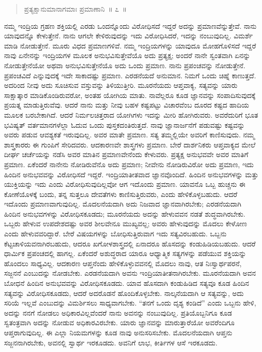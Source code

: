 \vspace{-0.1cm}

\begin{verse}
ಪ್ರತ್ಯಕ್ಷಾನುಮಾನಾಗಮಾಃ ಪ್ರಮಾಣಾನಿ~॥ ೭~॥
\end{verse}

\vspace{-0.3cm}


\vskip 6pt

ನಮ್ಮ ಇಂದ್ರಿಯ ಗ್ರಹಣ ಶಕ್ತಿಯಲ್ಲಿ ಎರಡು ಒಂದನ್ನೊಂದು ವಿರೋಧಿಸದೆ ಇದ್ದರೆ ಅದನ್ನು ಪ್ರಮಾಣವೆನ್ನುತ್ತೇವೆ. ನಾನು ಯಾವುದನ್ನೊ ಕೇಳುತ್ತೇನೆ. ನಾನು ಆಗಲೇ ಕೇಳಿರುವುದನ್ನು ಇದು ವಿರೋಧಿಸಿದರೆ, ಇದನ್ನು ನಂಬುವುದಿಲ್ಲ. ವಿಮರ್ಶೆ ಮಾಡಿ ನೋಡುತ್ತೇನೆ. ಮೂರು ವಿಧದ ಪ್ರಮಾಣಗಳಿವೆ. ನಮ್ಮ ಇಂದ್ರಿಯಗಳನ್ನು ಯಾವುದೂ ಮೋಹಗೊಳಿಸದೆ ಇದ್ದರೆ ನಾವು ಏನೇನನ್ನು ಇಂದ್ರಿಯಗಳ ಮೂಲಕ ಅನುಭವಿಸುತ್ತೇವೆಯೊ ಅದು ಪ್ರತ್ಯಕ್ಷ; ಅಂದರೆ ನಾನೇ ಸ್ವಂತವಾಗಿ ಏನನ್ನು ನೋಡುತ್ತೇನೆಯೋ ಅಥವಾ ಅನುಭವಿಸುತ್ತೇನೆಯೊ ಅದು ಒಂದು ಪ್ರಮಾಣ. ನಾನು ಪ್ರಪಂಚವನ್ನು ನೋಡುತ್ತೇನೆ. ಪ್ರಪಂಚವಿದೆ ಎನ್ನುವುದಕ್ಕೆ ಇದೇ ಸಾಕಾದಷ್ಟು ಪ್ರಮಾಣ. ಎರಡನೆಯದೆ ಅನುಮಾನ. ನಿಮಗೆ ಒಂದು ಚಿಹ್ನೆ ಕಾಣುತ್ತದೆ. ಅದರಿಂದ ನೀವು ಅದು ಸೂಚಿಸುವ ವಸ್ತುವನ್ನು ತಿಳಿಯುತ್ತೀರಿ. ಮೂರನೆಯದು ಆಪ್ತವಾಕ್ಯ, ಸತ್ಯವನ್ನು ಯಾರು ಸಾಕ್ಷಾತ್ಕಾರ ಮಾಡಿಕೊಂಡಿರುವರೋ, ಅಂತಹ ಯೋಗಿಯ ಮಾತು. ನಾವೆಲ್ಲರೂ ಕೂಡ ಜ್ಞಾನವನ್ನು ಸಂಪಾದಿಸುವುದಕ್ಕೆ ಪ್ರಯತ್ನ ಮಾಡುತ್ತಿರುವೆವು. ಆದರೆ ನಾನು ಮತ್ತು ನೀವು ಬಹಳ ಕಷ್ಟಪಟ್ಟು ವಿಚಾರವೆಂಬ ದೂರದ ಕಷ್ಟದ ಹಾದಿಯ ಮೂಲಕ ಬರಬೇಕಾಗಿದೆ. ಆದರೆ ನಿರ್ಮಲಚಿತ್ತರಾದ ಯೋಗಿಗಳು ಇದನ್ನು ಮೀರಿ ಹೋಗಿರುವರು. ಅವರೆದುರಿಗೆ ಭೂತ ಭವಿಷ್ಯತ್​ ವರ್ತಮಾನಗಳೆಲ್ಲಾ ಓದುವ ಒಂದು ಪುಸ್ತಕದಂತಿರುತ್ತದೆ. ನಾವು ಜ್ಞಾನಾರ್ಜನೆಗೆ ಪಡುವಷ್ಟು ಕಷ್ಟವನ್ನು ಅವರು ಪಡುವ ಆವಶ್ಯಕತೆ ಇರುವುದಿಲ್ಲ. ಅವರ ಮಾತೇ ಪ್ರಮಾಣ. ಸತ್ಯ ತಮ್ಮಲ್ಲಿಯೇ ಅವರಿಗೆ ಕಾಣಿಸುವುದು. ನಮ್ಮ ಶಾಸ್ತ್ರಕಾರರು ಈ ಗುಂಪಿಗೆ ಸೇರಿದವರು. ಆದಕಾರಣವೇ ಶಾಸ್ತ್ರಗಳು ಪ್ರಮಾಣ. ಬೇರೆ ದಾರ್ಶನಿಕರು ಆಪ್ತವಾಕ್ಯದ ಮೇಲೆ ದೀರ್ಘ ಚರ್ಚೆಯನ್ನು ನಡೆಸಿ ಅವರ ಮಾತಿನ ಪ್ರಮಾಣವೇನೆಂದು ಕೇಳುವರು. ಪ್ರತ್ಯಕ್ಷ ಅನುಭವವೇ ಅವರ ಮಾತಿಗೆ ಪ್ರಮಾಣ. ಏಕೆಂದರೆ ನಾನೇನು ನೋಡಿರುವೆನೊ ಅದು ಪ್ರಮಾಣ; ನೀವೇನು ನೋಡಿರುವಿರೋ ಅದು ಪ್ರಮಾಣ, ಇದು ಹಿಂದಿನ ಅನುಭವವನ್ನು ವಿರೋಧಿಸದೆ ಇದ್ದರೆ. ಇಂದ್ರಿಯಾತೀತವಾದ ಜ್ಞಾನವೊಂದಿದೆ. ಹಿಂದಿನ ಅನುಭವಗಳನ್ನು ಮತ್ತು ಯುಕ್ತಿಯನ್ನು ಇದು ಎಂದು ವಿರೋಧಿಸುವುದಿಲ್ಲವೋ ಆಗ ಇದೊಂದು ಪ್ರಮಾಣ. ಯಾವನೊ ಒಬ್ಬ ಹುಚ್ಚನು ಈ ಕೋಣೆಯೊಳಕ್ಕೆ ಬಂದು, ತನ್ನ ಸುತ್ತಲೂ ದೇವತೆಗಳು ಕಾಣಿಸುತ್ತಿರುವರು, ಎಂದು ಹೇಳಿಕೊಳ್ಳಬಹುದು. ಆದರೆ ಇದೊಂದು ಪ್ರಮಾಣವಾಗುವುದಿಲ್ಲ. ಮೊದಲನೆಯದಾಗಿ ಅದು ನಿಜವಾದ ಜ್ಞಾನವಾಗಿರಬೇಕು; ಎರಡನೆಯದಾಗಿ ಹಿಂದಿನ ಅನುಭವಗಳನ್ನು ವಿರೋಧಿಸಕೂಡದು; ಮೂರನೆಯದು ಅದನ್ನು ಹೇಳುವವನ ನಡತೆ ಶುದ್ಧವಾಗಿರಬೇಕು. ಒಬ್ಬರು ಹೇಳುವ ಉಪದೇಶದಷ್ಟು ಅವರ ಶೀಲವೇನೂ ಮುಖ್ಯವಲ್ಲ; ಅವರು ಹೇಳುವುದನ್ನು ಮೊದಲು ಕೇಳೋಣ ಎಂದು ಹೇಳುವವರಿದ್ದಾರೆ. ಬೇರೆ ವಿಷಯಗಳನ್ನು ಬೋಧಿಸುತ್ತಿರುವಾಗ ಇದು ಸತ್ಯವಿರಬಹುದು. ಒಬ್ಬನು ಕೆಟ್ಟಚಾಳಿಯವನಾಗಿರಬಹುದು, ಆದರೂ ಖಗೋಳಶಾಸ್ತ್ರದಲ್ಲಿ ಏನಾದರೂ ಹೊಸದನ್ನು ಕಂಡುಹಿಡಿಯಬಹುದು. ಆದರೆ ಧಾರ್ಮಿಕ ಪ್ರಪಂಚದಲ್ಲಿ ಹಾಗಲ್ಲ. ಏಕೆಂದರೆ ಅಶುದ್ಧರಾದ ಯಾರೂ ಆಧ್ಯಾತ್ಮಿಕ ಸತ್ಯಗಳನ್ನು ಪಡೆಯುವ ಶಕ್ತಿಯನ್ನು ಹೊಂದಲು ಸಾಧ್ಯವಿಲ್ಲ. ಆದಕಾರಣ ಆಪ್ತನೆಂದು ಹೇಳಿಕೊಳ್ಳುವವನಲ್ಲಿ ಮೊದಲು ನಾವು, ಆತ ನಿಃಸ್ವಾರ್ಥಪರನೆ, ಸಜ್ಜನನೆ ಎಂಬುದನ್ನು ನೋಡಬೇಕು. ಎರಡನೆಯದಾಗಿ ಅವನು ಇಂದ್ರಿಯಾತೀತನಾಗಿರಬೇಕು. ಮೂರನೆಯದಾಗಿ ಅವನ ಬೋಧನೆ ಹಿಂದಿನ ಅನುಭವವನ್ನು ವಿರೋಧಿಸಕೂಡದು. ಯಾವ ಹೊಸದಾಗಿ ಕಂಡುಹಿಡಿದ ಸತ್ಯವೂ ಕೂಡ ಹಿಂದಿನ ಸತ್ಯವನ್ನು ವಿರೋಧಿಸಕೂಡದು, ಆದರೆ ಅದರೊಡನೆ ಹೊಂದಿಕೊಳ್ಳಬೇಕು. ನಾಲ್ಕನೆಯದಾಗಿ ಆ ಸತ್ಯವನ್ನು, ಅದು ಸರಿಯೆ ಇಲ್ಲವೆ ಎಂಬುದನ್ನು ವಿಮರ್ಶಿಸಲು ಸಾಧ್ಯವಾಗಬೇಕು. “ತನಗೆ ಒಂದು ದೃಶ್ಯ ಕಂಡಿದೆ” ಎಂದು ಒಬ್ಬನು ಹೇಳಿ, ಅದನ್ನು ನನಗೆ ನೋಡಲು ಅಧಿಕಾರವಿಲ್ಲವೆಂದರೆ ನಾನು ಅವನನ್ನು ನಂಬುವುದಿಲ್ಲ. ಪ್ರತಿಯೊಬ್ಬನಿಗೂ ಕೂಡ ಸ್ವತಂತ್ರವಾಗಿ ಅದನ್ನು ನೋಡುವ ಅಧಿಕಾರವಿರಬೇಕು. ಯಾರು ಜ್ಞಾನವನ್ನು ಮಾರುತ್ತಾರೆಯೋ ಅವರೆಂದಿಗೂ ಆಪ್ತರಾಗುವುದಿಲ್ಲ. ಈ ಎಲ್ಲಾ ನಿಯಮಗಳನ್ನು ಕೂಡ ನಾವು ಅನುಸರಿಸಬೇಕು. ಮೊದಲನೆಯದಾಗಿ ಆಪ್ತನು ಸಜ್ಜನನಾಗಿರಬೇಕು, ಅವನಲ್ಲಿ ಸ್ವಾರ್ಥ ಇರಕೂಡದು. ಅವನಿಗೆ ಲಾಭ, ಕೀರ್ತಿಗಳ ಆಸೆ ಇರಕೂಡದು. 